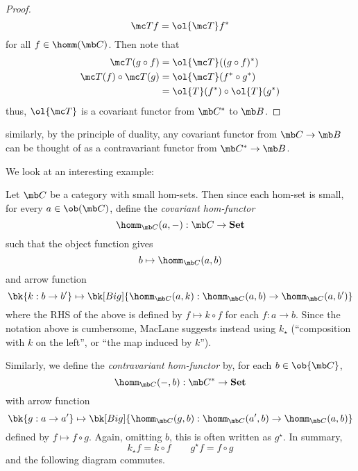 \documentclass[nocover]{pset}
\begin{document}
\begin{adjustwidth}{1em}{1em}
\begin{proof}
    \[
      \mc T f = \ol{\mc T} f^*
    \]
    for all $f \in \homm(\mb C)$. Then note that
    \begin{align*}
      \mc T(g \circ f)
      &= \ol{\mc T} ((g \circ f)^*) \\
      \mc T(f) \circ \mc T(g)
      &= \ol{\mc T} (f^* \circ g^*) \\
      &= \ol{T}(f^*) \circ \ol{T}(g^*)
    \end{align*}
    thus, $\ol{\mc T}$ is a covariant functor from $\mb C^*$ to $\mb
    B$.
  \end{proof}
  similarly, by the principle of duality, any covariant functor from
  $\mb C \to \mb B$ can be thought of as a contravariant functor from
  $\mb C^* \to \mb B$.

  We look at an interesting example:
  \begin{definition}
    Let $\mb C$ be a category with small hom-sets. Then since each
    hom-set is small, for every $a \in \ob(\mb C)$, define the
    \emph{covariant hom-functor}
    \[
      \homm_{\mb C}(a, -): \mb C \to \textbf{Set}
    \]
    such that the object function gives
    \[
      b \mapsto \homm_{\mb C}(a,b)
    \]
    and arrow function
    \[
      \bk{k : b \to b'} \mapsto \bk[Big]{\homm_{\mb C}(a,k) :
        \homm_{\mb C}(a,b) \to \homm_{\mb C}(a, b')}
    \]
    where the RHS of the above is defined by $f \mapsto k \circ f$ for
    each $f : a \to b$. Since the notation above is cumbersome,
    MacLane suggests instead using $k_\star$ (``composition with $k$ on
    the left'', or ``the map induced by $k$'').

    Similarly, we define the \emph{contravariant hom-functor} by, for
    each $b \in \ob{\mb C}$,
    \[
      \homm_{\mb C}(-,b) : \mb C^* \to \textbf{Set}
    \]
    with arrow function
    \[
      \bk{g : a \to a'} \mapsto \bk[Big]{\homm_{\mb C}(g, b) :
        \homm_{\mb C}(a',b) \to \homm_{\mb C}(a, b)}
    \]
    defined by $f \mapsto f \circ g$. Again, omitting $b$, this is
    often written as $g^\star$. In summary,
    \[
      k_\star f = k \circ f \qquad g^\star f = f \circ g
    \]
    and the following diagram commutes.
    \begin{figure}[H]
      \centering
      \tikzset{node distance=3cm, auto}
    \end{figure}
  \end{definition}


\end{adjustwidth}
\end{document}
